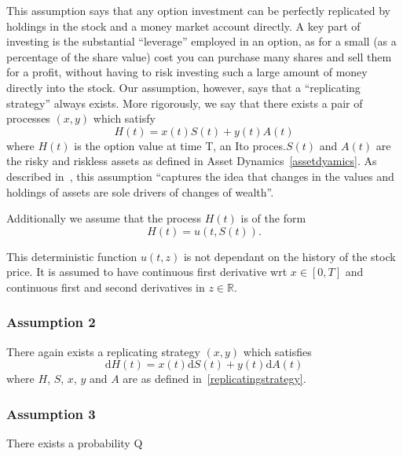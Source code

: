 \documentclass[11pt]{article} %
\begin{document}
This assumption says that any option investment can be perfectly replicated by holdings in 
the stock and a money market account directly. A key part of investing is the substantial 
``leverage'' employed in an option, as for a small (as a percentage of the share value) cost 
you can purchase many shares and sell them for a profit, without having to risk 
investing such a large amount of money directly into the stock. Our assumption, however, says 
that a ``replicating strategy'' always exists. More rigorously, we say that there exists a 
pair of processes $(x,y)$ which satisfy 
\begin{equation}
    H(t) = x(t)S(t) + y(t)A(t)
\end{equation}
where $H(t)$ is the option value at time T, an Ito proces.$S(t)$ and $A(t)$ are the risky 
and riskless assets as defined in Asset Dynamics~\ref{assetdyamics}. 
As described in~\cite{blackscholes}, this assumption ``captures the idea that changes in the 
values and holdings of assets are sole drivers of changes of wealth''.

Additionally we assume that the process $H(t)$ is of  the form 
\begin{equation}
    H(t) = u(t, S(t)).
\end{equation}

This deterministic function $u(t,z)$ is not dependant on the history of the stock price. 
It is assumed to have continuous first derivative wrt $x \in [0,T]$ and continuous first 
and second derivatives in $z \in \mathbb{R}$.

\subsubsection{Assumption 2}
There again exists a replicating strategy $(x,y)$ which satisfies 
\begin{equation}\label{replicatingderivative}
    \mathrm{d} H(t) = x(t)\mathrm{d} S(t) + y(t)\mathrm{d} A(t)
\end{equation}
where $H$, $S$, $x$, $y$ and $A$ are as defined in~\eqref{replicatingstrategy}.
\subsubsection{Assumption 3}
There exists a probability Q
\end{document}

